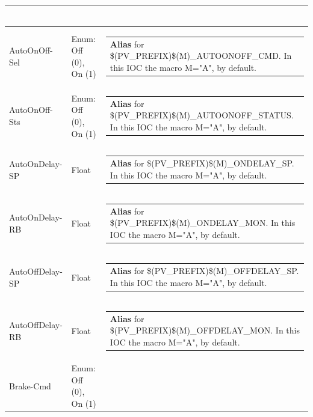 \documentclass[openany]{article}
\begin{document}
\begin{longtable}{| m{4.5cm} m{2.5cm}  m{8.5cm} |}
\begin{tabular}{@{}m{6cm}@{}}
            \end{tabular} \hypertarget{pv:auto-on-off}{}\\ \hline
        AutoOnOff-Sel & Enum: Off (0), On (1) & \begin{tabular}{@{}m{6cm}@{}}
                \textbf{\color{blue} Alias} for \$(PV\_PREFIX)\$(M)\_AUTOONOFF\_CMD. In this IOC the macro M="A", by default.
            \end{tabular} \hypertarget{}{}\\ \hline
        AutoOnOff-Sts & Enum: Off (0), On (1) & \begin{tabular}{@{}m{6cm}@{}}
                \textbf{\color{blue} Alias} for \$(PV\_PREFIX)\$(M)\_AUTOONOFF\_STATUS. In this IOC the macro M="A", by default.
            \end{tabular} \hypertarget{pv:auto-on-delay}{}\\ \hline
        AutoOnDelay-SP & Float & \begin{tabular}{@{}m{6cm}@{}}
                \textbf{\color{blue} Alias} for \$(PV\_PREFIX)\$(M)\_ONDELAY\_SP. In this IOC the macro M="A", by default.
            \end{tabular} \hypertarget{}{}\\ \hline
        AutoOnDelay-RB & Float & \begin{tabular}{@{}m{6cm}@{}}
                \textbf{\color{blue} Alias} for \$(PV\_PREFIX)\$(M)\_ONDELAY\_MON. In this IOC the macro M="A", by default.
            \end{tabular} \hypertarget{pv:auto-off-delay}{}\\ \hline
        AutoOffDelay-SP & Float & \begin{tabular}{@{}m{6cm}@{}}
                \textbf{\color{blue} Alias} for \$(PV\_PREFIX)\$(M)\_OFFDELAY\_SP. In this IOC the macro M="A", by default.
            \end{tabular} \hypertarget{}{}\\ \hline
        AutoOffDelay-RB & Float & \begin{tabular}{@{}m{6cm}@{}}
                \textbf{\color{blue} Alias} for \$(PV\_PREFIX)\$(M)\_OFFDELAY\_MON. In this IOC the macro M="A", by default.
            \end{tabular} \hypertarget{pv:brake-cmd}{}\\ \hline
        Brake-Cmd & Enum: Off (0), On (1) & \begin{tabular}{@{}m{6cm}@{}}

\end{tabular}
\end{longtable}
\end{document}
